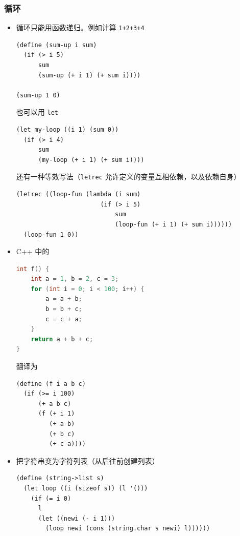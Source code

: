 \subsubsection{循环}
\begin{itemize}
\item 循环只能用函数递归。例如计算 \verb`1+2+3+4`
\begin{lstlisting}[language=none]
(define (sum-up i sum)
  (if (> i 5)
      sum
      (sum-up (+ i 1) (+ sum i))))

(sum-up 1 0)
\end{lstlisting}
也可以用 \verb`let`
\begin{lstlisting}[language=none]
(let my-loop ((i 1) (sum 0))
  (if (> i 4)
      sum
      (my-loop (+ i 1) (+ sum i))))
\end{lstlisting}
还有一种等效写法（\verb`letrec` 允许定义的变量互相依赖，以及依赖自身）
\begin{lstlisting}[language=none]
(letrec ((loop-fun (lambda (i sum)
                       (if (> i 5)
                           sum
                           (loop-fun (+ i 1) (+ sum i))))))
  (loop-fun 1 0))
\end{lstlisting}

\item C++ 中的
\begin{lstlisting}[language=cpp]
int f() {
    int a = 1, b = 2, c = 3;
    for (int i = 0; i < 100; i++) {
        a = a + b;
        b = b + c;
        c = c + a;
    }
    return a + b + c;
}
\end{lstlisting}
翻译为
\begin{lstlisting}[language=none]
(define (f i a b c)
  (if (>= i 100)
      (+ a b c)
      (f (+ i 1)
         (+ a b)
         (+ b c)
         (+ c a))))
\end{lstlisting}

\item 把字符串变为字符列表（从后往前创建列表）
\begin{lstlisting}[language=none]
(define (string->list s)
  (let loop ((i (sizeof s)) (l '()))
    (if (= i 0)
	  l
	  (let ((newi (- i 1)))
	    (loop newi (cons (string.char s newi) l))))))
\end{lstlisting}
\end{itemize}

